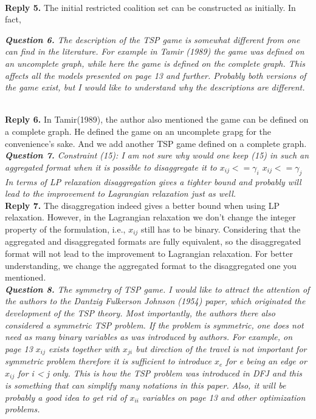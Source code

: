 \documentclass[11pt]{article}
\begin{document}
\\[2mm]
\noindent \textbf{Reply 5.}
The initial restricted coalition set can be constructed as
initially.
In fact,

%
%
%
\noindent \textit{\textbf{Question 6.}
The description of the TSP game is somewhat different from one can find in the literature. For example in Tamir (1989) the game was defined on an uncomplete graph, while here the game is defined on the complete graph. This affects all the models presented on page 13 and further. Probably both versions of the game exist, but I would like to understand why the descriptions are different.}

\\[2mm]
\noindent \textbf{Reply 6.}
In Tamir(1989), the author also mentioned the game can be defined on a complete graph. He defined the game on an uncomplete grapg for the convenience's sake.
And we add another TSP game defined on a complete graph.
\\[4mm]


\noindent \textit{\textbf{Question 7.}
Constraint (15): I am not sure why would one keep (15) in such an aggregated format when it is possible to disaggregate it to
$x_{ij} <= \gamma_i$
$x_{ij} <= \gamma_j$
In terms of LP relaxation disaggregation gives a tighter bound and probably will lead to the improvement to Lagrangian relaxation just as well.}
\\[2mm]
\noindent \textbf{Reply 7.}
The disaggregation indeed gives a better bound when using LP relaxation.
However, in the Lagrangian relaxation we don't change the integer property of the formulation, i.e., $x_{ij}$ still has to be binary.
Considering that the aggregated and disaggregated formats are fully equivalent, so the disaggregated format will not lead to the improvement to Lagrangian relaxation.
For better understanding, we change the aggregated format to the disaggregated one you mentioned.
\\[4mm]


\noindent \textit{\textbf{Question 8.}
The symmetry of TSP game. I would like to attract the attention of the authors to the Dantzig Fulkerson Johnson (1954) paper, which originated the development of the TSP theory. Most importantly, the authors there also considered a symmetric TSP problem. If the problem is symmetric, one does not need as many binary variables as was introduced by authors. For example, on page 13 $x_{ij}$ exists together with $x_{ji}$ but direction of the travel is not important for symmetric problem therefore it is sufficient to introduce $x_e$ for e being an edge or $x_{ij}$ for i < j only. This is how the TSP problem was introduced in DFJ and this is something that can simplify many notations in this paper. Also, it will be probably a good idea to get rid of $x_{ii}$ variables on page 13 and other optimization problems.}
\end{document}
